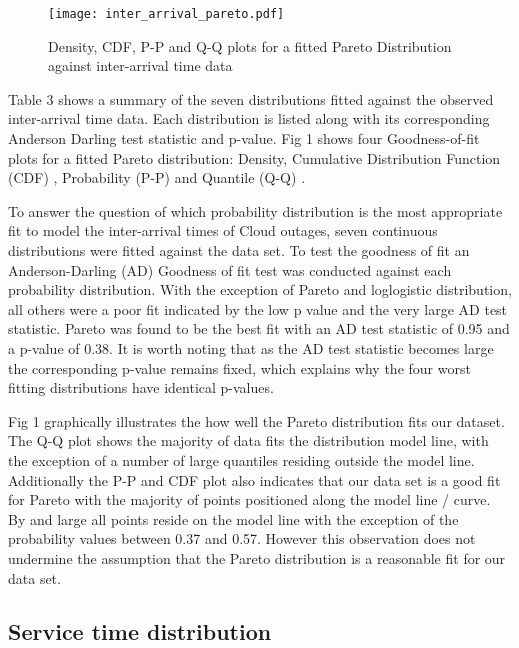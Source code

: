 \documentclass[5p]{elsarticle}
\begin{document}
\begin{figure*}[]
\begin{center}
\texttt{[image: inter\_arrival\_pareto.pdf]} 
\caption{Density, CDF, P-P and Q-Q plots for a fitted Pareto Distribution against inter-arrival time data}
\end{center}
\label{fig:outagedistribution}
\end{figure*}

Table 3 shows a summary of the seven distributions fitted against the observed inter-arrival time data. Each distribution is listed along with its corresponding Anderson Darling test statistic and p-value. Fig 1 shows four Goodness-of-fit plots for a fitted Pareto distribution: Density, Cumulative Distribution Function (CDF) , Probability (P-P) \cite{gibbons2011nonparametric}  and Quantile (Q-Q) \cite{wilk1968probability}.  

To answer the question of which probability distribution is the most appropriate fit to model the inter-arrival times of Cloud outages, seven continuous distributions were fitted against the data set. To test the goodness of fit an Anderson-Darling (AD) Goodness of fit test was conducted against each probability distribution. With the exception of Pareto and loglogistic distribution, all others were a poor fit indicated by the low p value and the very large AD test statistic. Pareto was found to be the best fit with an AD test statistic of 0.95 and a p-value of 0.38. It is worth noting that as the AD test statistic becomes large the corresponding p-value remains fixed, which explains why the four worst fitting distributions have identical p-values.

Fig 1 graphically illustrates the how well the Pareto distribution fits our dataset. The Q-Q plot shows the majority of data fits the distribution model line, with the exception of a number of large quantiles residing outside the model line. Additionally the P-P and CDF plot also indicates that our data set is a good fit for Pareto with the majority of points positioned along the model line / curve. By and large all points reside on the model line with the exception of the probability values between 0.37 and 0.57. However this observation does not undermine the assumption that the Pareto distribution is a reasonable fit for our data set. 

\subsection{Service time distribution}
\end{document}
